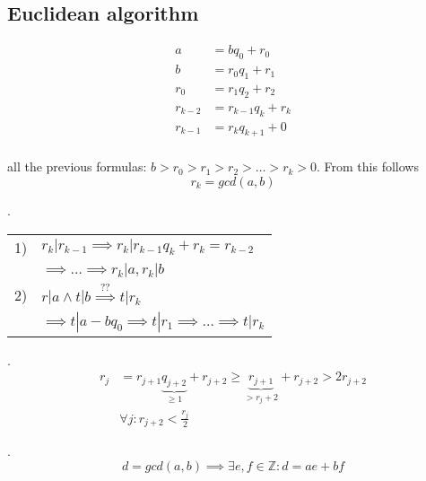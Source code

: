 

\subsection{Euclidean algorithm}
\begin{align*}
  a &= b q_0 +r_0 \\
  b &= r_0 q_1 + r_1 \\
  r_0 &= r_1 q_2 + r_2\\
  r_{k-2} &= r_{k-1}  q_k + r_k \\
  r_{k-1} &= r_{k}  q_{k+1} + 0 \\
\end{align*}

all the previous formulas: $ b > r_0 > r_1 > r_2 > \ldots > r_k > 0$. From this follows
\[
  r_k = gcd(a,b)
\]

\Proof. \\
\begin{tabular}{ll}
  1) & $r_k | r_{k-1} \implies r_k | r_{k-1} q_k + r_k = r_{k-2}$ \\
     & $\implies \ldots \implies r_k | a, r_k | b$ \\
  2) & $r | a \wedge t | b \stackrel{\text{??}}{\implies} t| r_k$ \\
     & $\implies t | a-bq_0 \implies t | r_1 \implies \ldots \implies t|r_k$
\end{tabular}


\Remark.
\begin{align*}
  r_j &= r_{j + 1} \underbrace{q_{j+2}}_{ \geq 1} + r_{j+2} \geq \underbrace{r_{j+1}}_{ > r_j+2} + r_{j+2} > 2 r_{j+2} \\
      & \forall j: r_{j+2} < \frac{r_j}{2}
\end{align*}

\Theorem.
\[
  d = gcd(a,b) \implies \exists e,f \in \mathbb{Z}: d = ae + bf
\]

